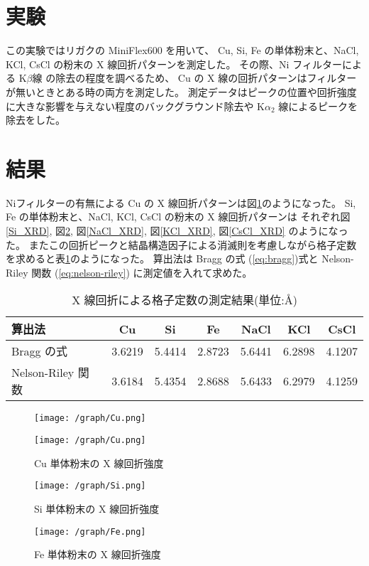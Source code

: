 \documentclass[11pt,dvipdfmx,a4paper]{jsarticle}
\begin{document}
\section{実験}
この実験ではリガクの MiniFlex600 を用いて、
Cu, Si, Fe の単体粉末と、NaCl, KCl, CsCl の粉末の X 線回折パターンを測定した。
その際、Ni フィルターによる K\(\beta\)線 の除去の程度を調べるため、
Cu の X 線の回折パターンはフィルターが無いときとある時の両方を測定した。
測定データはピークの位置や回折強度に大きな影響を与えない程度のバックグラウンド除去や
K\(\alpha_2\) 線によるピークを除去をした。

\section{結果}
Niフィルターの有無による Cu の X 線回折パターンは図\ref{Cu_XRD}のようになった。
Si, Fe の単体粉末と、NaCl, KCl, CsCl の粉末の X 線回折パターンは
それぞれ図\ref{Si_XRD}, 図\ref{Fe_XRD}, 図\ref{NaCl_XRD}, 図\ref{KCl_XRD}, 図\ref{CsCl_XRD} のようになった。
またこの回折ピークと結晶構造因子による消滅則を考慮しながら格子定数を求めると表\ref{table:result}のようになった。
算出法は Bragg の式 (\ref{eq:bragg})式と Nelson-Riley 関数 (\ref{eq:nelson-riley}) に測定値を入れて求めた。
\begin{table}[h]
	\centering
	\caption{X 線回折による格子定数の測定結果(単位:\AA)} \label{table:result}
	\begin{tabular}[pos]{lcccccc}
		\hline \hline
		算出法 & Cu & Si & Fe & NaCl & KCl & CsCl \\
		\hline
		Bragg の式 & 3.6219 & 5.4414 & 2.8723 & 5.6441 & 6.2898 & 4.1207 \\
		Nelson-Riley 関数 & 3.6184 & 5.4354 & 2.8688 & 5.6433 & 6.2979 & 4.1259\\
		\hline \hline
	\end{tabular}
\end{table}
\begin{figure}[h]
	\centering
	\begin{minipage}[t]{0.48\columnwidth}
		\centering
		\texttt{[image: /graph/Cu.png]}
	\end{minipage}
	\hfil
	\begin{minipage}[t]{0.48\columnwidth}
		\centering
		\texttt{[image: /graph/Cu.png]}
	\end{minipage}
	\caption{Cu 単体粉末の X 線回折強度}
	\label{Cu_XRD}
\end{figure}
\begin{figure}[h]
	\centering
	\begin{minipage}[t]{0.48\columnwidth}
		\centering
		\texttt{[image: /graph/Si.png]}
		\caption{Si 単体粉末の X 線回折強度}
		\label{Si_XRD}
	\end{minipage}
	\hfil
	\begin{minipage}[t]{0.48\columnwidth}
		\centering
		\texttt{[image: /graph/Fe.png]}
		\caption{Fe 単体粉末の X 線回折強度}
		\label{Fe_XRD}
	\end{minipage}
\end{figure}
\end{document}
